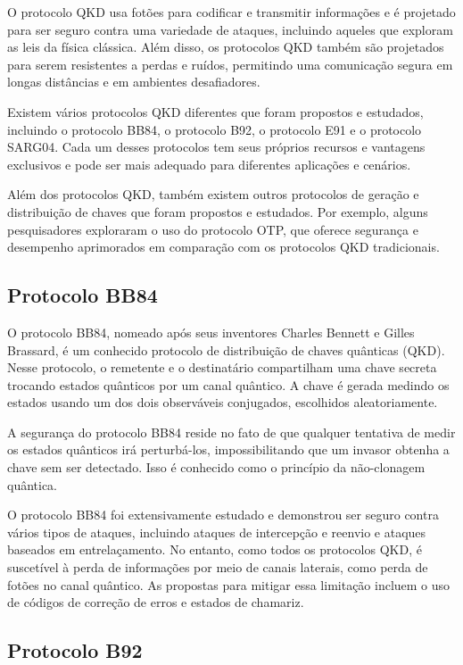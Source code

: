O protocolo QKD usa fotões para codificar e transmitir informações e é projetado para ser seguro contra uma variedade de ataques, incluindo aqueles que exploram as leis da física clássica. Além disso, os protocolos QKD também são projetados para serem resistentes a perdas e ruídos, permitindo uma comunicação segura em longas distâncias e em ambientes desafiadores.

Existem vários protocolos QKD diferentes que foram propostos e estudados, incluindo o protocolo BB84, o protocolo B92, o protocolo E91 e o protocolo SARG04. Cada um desses protocolos tem seus próprios recursos e vantagens exclusivos e pode ser mais adequado para diferentes aplicações e cenários.

Além dos protocolos QKD, também existem outros protocolos de geração e distribuição de chaves que foram propostos e estudados. Por exemplo, alguns pesquisadores exploraram o uso do protocolo OTP, que oferece segurança e desempenho aprimorados em comparação com os protocolos QKD tradicionais.

\subsection{Protocolo BB84}

O protocolo BB84, nomeado após seus inventores Charles Bennett e Gilles Brassard, é um conhecido protocolo de distribuição de chaves quânticas (QKD). Nesse protocolo, o remetente e o destinatário compartilham uma chave secreta trocando estados quânticos por um canal quântico. A chave é gerada medindo os estados usando um dos dois observáveis conjugados, escolhidos aleatoriamente.

A segurança do protocolo BB84 reside no fato de que qualquer tentativa de medir os estados quânticos irá perturbá-los, impossibilitando que um invasor obtenha a chave sem ser detectado. Isso é conhecido como o princípio da não-clonagem quântica.

O protocolo BB84 foi extensivamente estudado e demonstrou ser seguro contra vários tipos de ataques, incluindo ataques de intercepção e reenvio e ataques baseados em entrelaçamento. No entanto, como todos os protocolos QKD, é suscetível à perda de informações por meio de canais laterais, como perda de fotões no canal quântico. As propostas para mitigar essa limitação incluem o uso de códigos de correção de erros e estados de chamariz.

\subsection{Protocolo B92}

